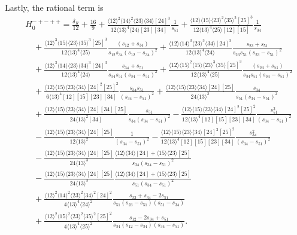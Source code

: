 \documentclass[11pt]{article}
\newcommand{\nn}{\nonumber}
\newcommand{\la}{\langle}
\newcommand{\ra}{\rangle}
\begin{document}
Lastly, the rational term is
\begin{align}
		&H_0^{-+-++} 
		= \frac{\delta_R}{12}  
			+ \frac{16}{9}
			+ \frac{\la12\ra^2 \la14\ra^2 \la23\ra \la34\ra [ 24 ]^3}{12 \la13\ra^4 \la24\ra [ 23 ] [ 34 ]}
				\frac{1}{s_{51}}
			+ \frac{\la12\ra \la15\ra \la23\ra^2 \la35\ra^2 [ 25 ]^3}{12 \la13\ra^4 \la25\ra [ 12 ] [ 15 ]}
				\frac{1}{s_{34}}
		\nn\\&\quad
			+ \frac{\la12\ra^3 \la15\ra \la23\ra \la35\ra^3 [ 25 ]^3}{12 \la13\ra^4 \la25\ra}
				\frac{(s_{12}+s_{34})}{s_{12} s_{34} (s_{12}-s_{34})^2}
			+\frac{\la 12 \ra \la 14 \ra^3 \la 23 \ra^3 \la 34 \ra [ 24 ]^3}{12 \la13\ra^4 \la24\ra}
				\frac{s_{23}+s_{51}}{s_{23} s_{51} (s_{23}-s_{51})^2}			
		\nn\\&\quad
			+ \frac{\la 12 \ra^3 \la 14 \ra \la 23 \ra \la 34 \ra^3[ 24 ]^3}{12 \la13\ra^4 \la24\ra}
				\frac{s_{34}+s_{51}}{s_{34} s_{51} (s_{34}-s_{51})^2}
			+ \frac{\la12\ra \la15\ra^2 \la15\ra \la23\ra^3 \la35\ra [ 25 ]^3}{12\la13\ra^4 \la25\ra}
				\frac{(s_{34}+s_{51})}{s_{34} s_{51} (s_{34}-s_{51})^2}
		\nn\\&\quad 
			+ \frac{\la12\ra \la15\ra \la23\ra \la34\ra [ 24 ]^2 [ 25 ]^2}{6 \la13\ra^4 [ 12 ] [ 15 ] [ 23 ] [ 34 ]}
				\frac{s_{34}s_{51}}{(s_{34}-s_{51})^2}
			+ \frac{\la12\ra \la15\ra \la23\ra \la34\ra [ 24 ] [ 25 ]}{24 \la13\ra^2}
					\frac{s_{34}}{s_{51} (s_{34}-s_{51})^2}
		\nn\\&\quad
			+ \frac{\la12\ra \la15\ra \la23\ra \la34\ra [ 24 ] [ 34 ] [ 25 ]}{24 \la13\ra^2 [ 34 ]}
				\frac{s_{51}}{s_{34} (s_{34}-s_{51})^2}
			- \frac{\la12\ra \la15\ra \la23\ra \la34\ra [ 24 ]^2 [ 25 ]^2}{12 \la13\ra^4 [ 12 ] [ 15 ] [ 23 ] [ 34 ]}
				\frac{s_{51}^2}{(s_{34}-s_{51})^2}
		\nn\\&\quad
			- \frac{\la12\ra \la15\ra \la23\ra \la34\ra [ 24 ] [ 25 ]}{12 \la13\ra^2}
				\frac{1}{(s_{34}-s_{51})^2 }
			- \frac{\la12\ra \la15\ra \la23\ra \la34\ra [ 24 ]^2 [ 25 ]^2}{12 \la13\ra^4 [ 12 ] [ 15 ] [ 23 ] [ 34 ]}
				\frac{s_{34}^2}{(s_{34}-s_{51})^2}
\nn\\&\quad
			- \frac{\la12\ra \la15\ra \la23\ra \la34\ra [ 24 ] [ 25 ]}{24 \la13\ra^3}
				\frac{\la 12 \ra \la 34 \ra [ 24 ] + \la 15 \ra \la 23 \ra [ 25 ]}{s_{34} (s_{34}-s_{51})^2}
		\nn\\&\quad
			- \frac{\la12\ra \la15\ra \la23\ra \la34\ra [ 24 ] [ 25 ]}{24 \la13\ra^3}
				\frac{\la 12 \ra \la 34 \ra [ 24 ] + \la 15 \ra \la 23 \ra [ 25 ]}{s_{51} (s_{34}-s_{51})^2}
		\nn\\&\quad
			+ \frac{\la 12 \ra^2 \la 14 \ra^2 \la 23 \ra^2 \la 34 \ra^2 [ 24 ]^2}{4\la 13 \ra^4 \la 24 \ra^2}
				\frac{s_{23}+s_{34}-2 s_{51}}{s_{51} (s_{23}-s_{51}) (s_{51}-s_{34})}
		\nn\\&\quad
			+ \frac{\la12\ra^2 \la15\ra^2 \la23\ra^2 \la35\ra^2 [ 25 ]^2 }{4\la13\ra^4 \la25\ra^2}
				\frac{s_{12}-2 s_{34}+s_{51}}{s_{34} (s_{12}-s_{34})(s_{34}-s_{51})}
			.
\end{align}
\end{document}
